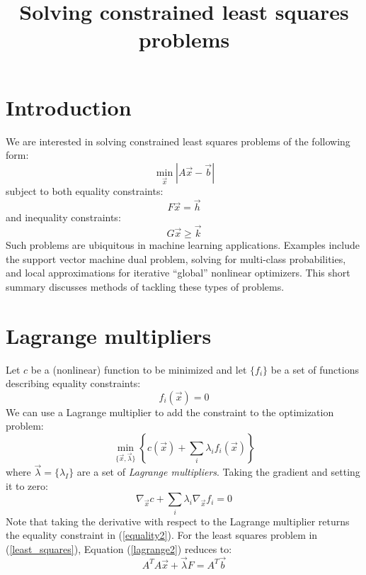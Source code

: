 \documentclass{article}
\title{Solving constrained least squares problems}
\newcommand{\mat}{A}
\newcommand{\sol}{b}
\newcommand{\eqmat}{F}
\newcommand{\eqvec}{h}
\newcommand{\ineqmat}{G}
\newcommand{\ineqvec}{k}
\newcommand{\cost}{c}
\newcommand{\eqfn}{f}
\newcommand{\coord}{x}
\begin{document}
\tableofcontents

\section{Introduction}

We are interested in solving constrained least squares problems of 
the following form:
\begin{equation}
	\min_{\vec \coord} | \mat \vec \coord - \vec \sol |
	\label{least_squares}
\end{equation}
subject to both equality constraints:
\begin{equation}
	\eqmat \vec \coord = \vec \eqvec 
\end{equation}
and inequality constraints:
\begin{equation}
	\ineqmat \vec \coord \ge \vec \ineqvec
\end{equation}
Such problems are ubiquitous in machine learning applications.
Examples include the support vector machine dual problem, solving
for multi-class probabilities, and local approximations for iterative 
``global'' nonlinear optimizers.
This short summary discusses methods of tackling these types of problems.

\section{Lagrange multipliers}

Let $\cost$ be a (nonlinear) function to be minimized and let $\lbrace \eqfn_i \rbrace$ be a set of functions describing equality constraints:
\begin{equation}
	\eqfn_i(\vec \coord) = 0
 	\label{equality2}
\end{equation}
We can use a Lagrange multiplier to add the constraint to the optimization
problem:
\begin{equation}
	\min_{\lbrace \vec \coord, \vec \lambda \rbrace} \left \lbrace \cost(\vec \coord) + \sum_i \lambda_i \eqfn_i(\vec \coord) \right \rbrace
\end{equation}
where $\vec \lambda=\lbrace \lambda_I \rbrace$ are a set of {\it Lagrange multipliers}.
Taking the gradient and setting it to zero:
\begin{equation}
	\nabla_{\vec \coord} \cost + \sum_i \lambda_i \nabla_{\vec \coord} \eqfn_i = 0 
	\label{lagrange2}
\end{equation}
Note that taking the derivative with respect to the Lagrange multiplier
returns the equality constraint in (\ref{equality2}).
For the least squares problem in (\ref{least_squares}), 
Equation (\ref{lagrange2}) reduces to:
\begin{equation}
	\mat^T \mat \vec \coord + \vec \lambda \eqmat = \mat^T \vec \sol
\end{equation}
\citep{Lawson_Hanson1995}
\end{document}
